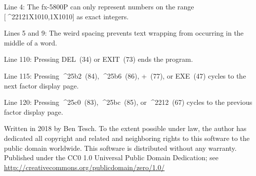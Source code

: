 \documentclass[11pt,letterpaper]{article}
\newcommand{\MINUS}{^^^^2212}
\newcommand{\EXPTEN}{{\scriptsize X10}}
\newcommand{\UPTRIANG}{^^^^25b2}
\newcommand{\RIGHTTRIANG}{^^^^25b6}
\newcommand{\DOWNTRIANG}{^^^^25bc}
\newcommand{\LEFTTRIANG}{^^^^25c0}
\begin{document}
\begin{multicols}{2}
Line 4: The fx-5800P can only represent numbers on the range [\MINUS 1\EXPTEN 10,1\EXPTEN 10] as exact integers.

Lines 5 and 9: The weird spacing prevents text wrapping from occurring in the middle of a word.

Line 110: Pressing DEL~(34) or EXIT~(73) ends the program.

Line 115: Pressing \UPTRIANG~(84), \RIGHTTRIANG~(86), +~(77), or EXE~(47) cycles to the next factor display page.

Line 120: Pressing \LEFTTRIANG~(83), \DOWNTRIANG~(85), or \MINUS~(67) cycles to the previous factor display page.

\vspace{3ex}
\scriptsize{Written in 2018 by Ben Tesch. To the extent possible under law, the author has dedicated all copyright and related and neighboring rights to this software to the public domain worldwide. This software is distributed  without any warranty. Published under the CC0 1.0 Universal Public Domain Dedication; see \url{http://creativecommons.org/publicdomain/zero/1.0/}} 
\end{multicols}
\end{document}
